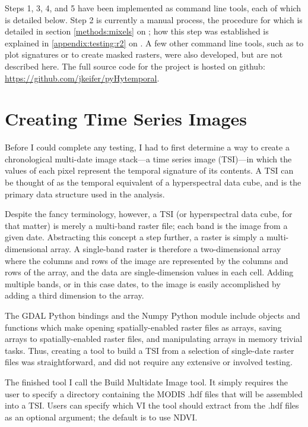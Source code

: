 Steps 1, 3, 4, and 5 have been implemented as command line tools, each of which is detailed below. Step 2 is currently a manual process, the procedure for which is detailed in section \autoref{methods:mixels} on ; how this step was established is explained in \autoref{appendix:testing:r2} on . A few other command line tools, such as to plot signatures or to create masked rasters, were also developed, but are not described here. The full source code for the project is hosted on github: \url{https://github.com/jkeifer/pyHytemporal}. 

\section{Creating Time Series Images}
\label{appendix:tools:build}

Before I could complete any testing, I had to first determine a way to create a chronological multi-date image stack---a time series image (TSI)---in which the values of each pixel represent the temporal signature of its contents. A TSI can be thought of as the temporal equivalent of a hyperspectral data cube, and is the primary data structure used in the analysis.

Despite the fancy terminology, however, a TSI (or hyperspectral data cube, for that matter) is merely a multi-band raster file; each band is the image from a given date. Abstracting this concept a step further, a raster is simply a multi-dimensional array. A single-band raster is therefore a two-dimensional array where the columns and rows of the image are represented by the columns and rows of the array, and the data are single-dimension values in each cell. Adding multiple bands, or in this case dates, to the image is easily accomplished by adding a third dimension to the array.

The GDAL Python bindings and the Numpy Python module include objects and functions which make opening spatially-enabled raster files as arrays, saving arrays to spatially-enabled raster files, and manipulating arrays in memory trivial tasks. Thus, creating a tool to build a TSI from a selection of single-date raster files was straightforward, and did not require any extensive or involved testing.

The finished tool I call the Build Multidate Image tool. It simply requires the user to specify a directory containing the MODIS .hdf files that will be assembled into a TSI. Users can specify which VI the tool should extract from the .hdf files as an optional argument; the default is to use NDVI.

